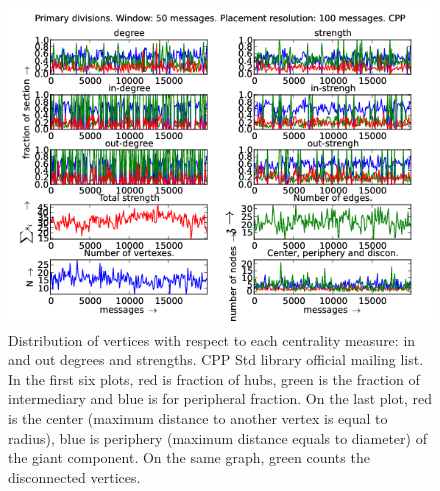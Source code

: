 \documentclass[%
 aip,
 jmp,%
 amsmath,amssymb,
 reprint,%
]{revtex4-1}
\begin{document}
\begin{figure}[hbtp] 
   \centering
        \includegraphics[width=\textwidth]{figs/CPP/50}
    \caption{Distribution of vertices with respect to each centrality measure: in and out degrees and strengths. CPP Std library official mailing list. In the first six plots, red is fraction of hubs, green is the fraction of intermediary and blue is for peripheral fraction. On the last plot, red is the center (maximum distance to another vertex is equal to radius), blue is periphery (maximum distance equals to diameter) of the giant component. On the same graph, green counts the disconnected vertices.}
    \label{fig:cpp50}
\end{figure}
\end{document}
